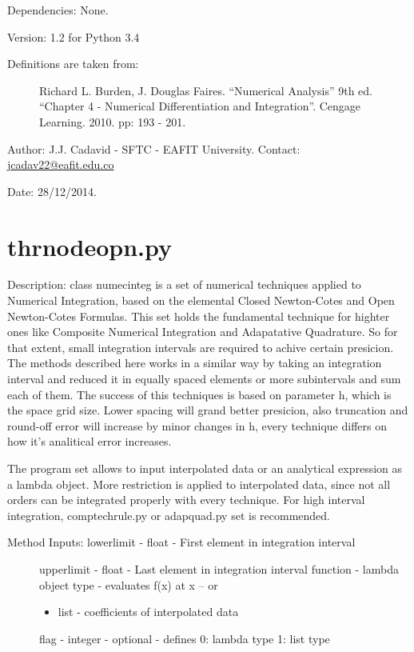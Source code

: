 \documentclass[letterpaper,10pt,oneside]{sphinxmanual}
\theoremstyle{plain}%
\theoremstyle{definition}%
\theoremstyle{remark}%
\begin{document}
Dependencies: None.

Version: 1.2 for Python 3.4
\begin{description}
\item[{Definitions are taken from:}] \leavevmode
Richard L. Burden, J. Douglas Faires. ``Numerical Analysis'' 9th ed.
``Chapter 4 - Numerical Differentiation and Integration''. 
Cengage Learning. 2010. pp: 193 - 201.

\end{description}

Author: J.J. Cadavid - SFTC - EAFIT University.
Contact: \href{mailto:jcadav22@eafit.edu.co}{jcadav22@eafit.edu.co}

Date: 28/12/2014.


\section{thrnodeopn.py}
\label{code:module-thrnodeopn}\label{code:thrnodeopn-py}
Description: class numecinteg is a set of numerical techniques applied to
Numerical Integration, based on the elemental Closed Newton-Cotes and
Open Newton-Cotes Formulas. This set holds the fundamental technique for
highter ones like Composite Numerical Integration and Adapatative Quadrature.
So for that extent, small integration intervals are required to achive certain
presicion. The methods described here works in a similar way by taking an
integration interval and reduced it in equally spaced elements or more 
subintervals and sum each of them. The success of this techniques is based
on parameter h, which is the space grid size. Lower spacing will grand better
presicion, also truncation and round-off error will increase by minor changes
in h, every technique differs on how it's analitical error increases.

The program set allows to input interpolated data or an analytical expression
as a lambda object. More restriction is applied to interpolated data, since
not all orders can be integrated properly with every technique. For high 
interval integration, comptechrule.py or adapquad.py set is recommended.
\begin{description}
\item[{Method Inputs: lowerlimit - float - First element in integration interval}] \leavevmode
upperlimit - float - Last element in integration interval
function - lambda object type - evaluates f(x) at x -- or
\begin{itemize}
\item {} 
list - coefficients of interpolated data

\end{itemize}

flag - integer - optional - defines 0: lambda type 1: list type

\end{description}
\end{document}
